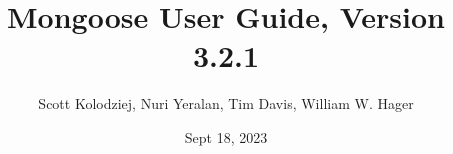 \title{Mongoose User Guide, Version 3.2.1}
\author{Scott Kolodziej, Nuri Yeralan, Tim Davis, William W. Hager}
\date{Sept 18, 2023}
